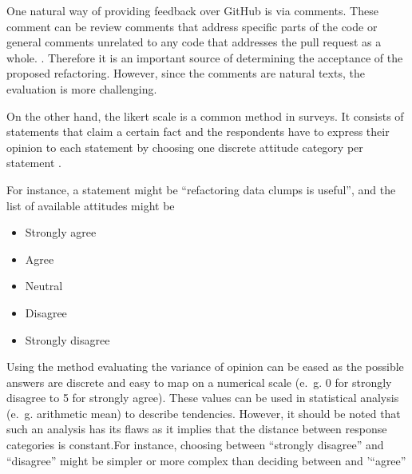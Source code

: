 One  natural way of providing feedback over GitHub is via comments. These comment can be review comments that address specific parts of the code or general comments unrelated to any code that addresses the pull request as a whole. \cite{10.1145/3597208}. Therefore it is an important source of determining the acceptance of the proposed refactoring. However, since the comments are natural texts, the evaluation is more challenging.


On the other hand, the likert scale is a common method in surveys. It consists of statements that claim a certain fact and the respondents have to express their opinion to each statement by choosing one discrete attitude category per statement . \cite{edmondson2005likert}

For instance, a statement might be \enquote{refactoring data clumps is useful}, and the list of available attitudes might be
\begin{itemize}
    \item Strongly agree
    \item Agree
    \item Neutral
    \item Disagree
    \item Strongly disagree
\end{itemize}

Using the method evaluating the variance of opinion can be eased as the possible answers are discrete and easy to map on a numerical scale (e.~g. 0 for strongly disagree to 5 for strongly agree). These values can be used in statistical analysis (e.~g. arithmetic mean) to describe tendencies. However, it should be noted that such an analysis has its flaws as it implies that the distance between response categories is constant.For instance, choosing between \enquote{strongly disagree} and \enquote{disagree} might be simpler or more complex than deciding between  and '\enquote{agree} \cite{HARPE2015836}


